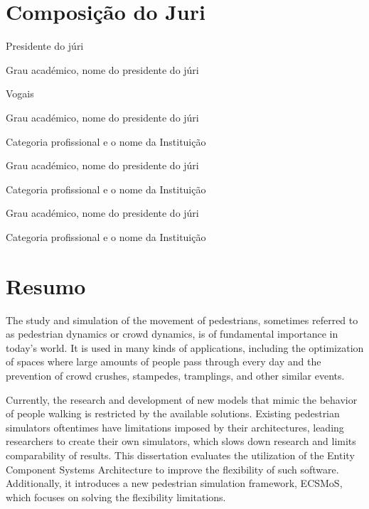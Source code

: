 \documentclass[twoside, 11pt]{article}
\begin{document}
 
\blankpage
\newpage

\section*{Composição do Juri}

\noindent Presidente do júri

Grau académico, nome do presidente do júri

\noindent Vogais

Grau académico, nome do presidente do júri

Categoria profissional e o nome da Instituição

\vspace{1cm}

Grau académico, nome do presidente do júri

Categoria profissional e o nome da Instituição

\vspace{1cm}

Grau académico, nome do presidente do júri

Categoria profissional e o nome da Instituição

\clearpage            %
\null                %
\newpage             %

\section*{Resumo}

The study and simulation of the movement of pedestrians, sometimes referred to as pedestrian dynamics or crowd dynamics, is of fundamental importance in today's world. It is used in many kinds of applications, including the optimization of spaces where large amounts of people pass through every day and the prevention of crowd crushes, stampedes, tramplings, and other similar events.

Currently, the research and development of new models that mimic the behavior of people walking is restricted by the available solutions. Existing pedestrian simulators oftentimes have limitations imposed by their architectures, leading researchers to create their own simulators, which slows down research and limits comparability of results. This dissertation evaluates the utilization of the Entity Component Systems Architecture to improve the flexibility of such software. Additionally, it introduces a new pedestrian simulation framework, ECSMoS, which focuses on solving the flexibility limitations.
\end{document}
